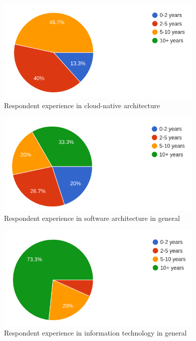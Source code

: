 \documentclass[utf8,english]{gradu3}
\begin{document}
\begin{figure}[h]\centering
  \includegraphics[width=10cm]{images/demographics-experience-cloud-native-crop1.png}
  \caption{Respondent experience in cloud-native architecture}
  \label{figure:experience-cna}
\end{figure}

\begin{figure}[h]\centering
  \includegraphics[width=10cm]{images/demographics-experience-software-architecture-crop1.png}
  \caption{Respondent experience in software architecture in general}
  \label{figure:experience-architecture}
\end{figure}

\begin{figure}[h]\centering
  \includegraphics[width=10cm]{images/demographics-experience-information-technology-crop1.png}
  \caption{Respondent experience in information technology in general}
  \label{figure:experience-it}
\end{figure}

\end{document}
